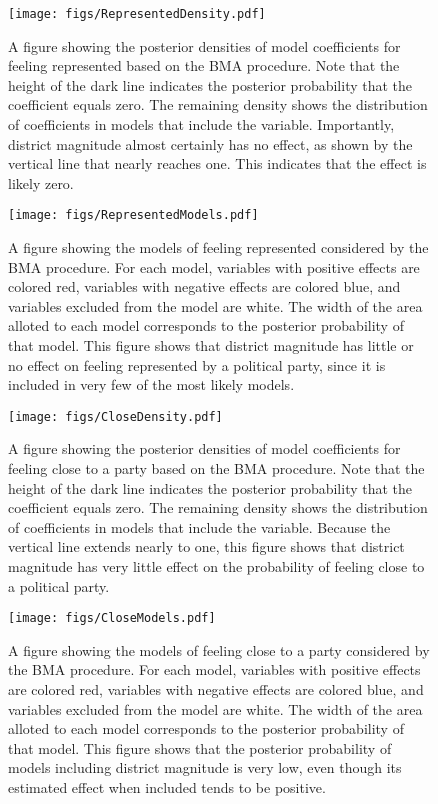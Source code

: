\documentclass[12pt]{article}
\begin{document}



\newpage
\begin{figure}[h]
\texttt{[image: figs/RepresentedDensity.pdf]}
\caption{A figure showing the posterior densities of model coefficients for feeling represented based on the BMA procedure. Note that the height of the dark line indicates the posterior probability that the coefficient equals zero. The remaining density shows the distribution of coefficients in models that include the variable. Importantly, district magnitude almost certainly has no effect, as shown by the vertical line that nearly reaches one. This indicates that the effect is likely zero.}\label{fig:RepresentedDensity}
\end{figure}

\newpage
\begin{figure}[h]
\texttt{[image: figs/RepresentedModels.pdf]}
\caption{A figure showing the models of feeling represented considered by the BMA procedure. For each model, variables with positive effects are colored red, variables with negative effects are colored blue, and variables excluded from the model are white. The width of the area alloted to each model corresponds to the posterior probability of that model. This figure shows that district magnitude has little or no effect on feeling represented by a political party, since it is included in very few of the most likely models.}\label{fig:RepresentedModels}
\end{figure}



\newpage
\begin{figure}[h]
\texttt{[image: figs/CloseDensity.pdf]}
\caption{A figure showing the posterior densities of model coefficients for feeling close to a party based on the BMA procedure. Note that the height of the dark line indicates the posterior probability that the coefficient equals zero. The remaining density shows the distribution of coefficients in models that include the variable. Because the vertical line extends nearly to one, this figure shows that district magnitude has very little effect on the probability of feeling close to a political party.}\label{fig:CloseDensity}
\end{figure}

\newpage
\begin{figure}[h]
\texttt{[image: figs/CloseModels.pdf]}
\caption{A figure showing the models of feeling close to a party considered by the BMA procedure. For each model, variables with positive effects are colored red, variables with negative effects are colored blue, and variables excluded from the model are white. The width of the area alloted to each model corresponds to the posterior probability of that model. This figure shows that the posterior probability of models including district magnitude is very low, even though its estimated effect when included tends to be positive.}\label{fig:CloseModels}
\end{figure}
\end{document}
